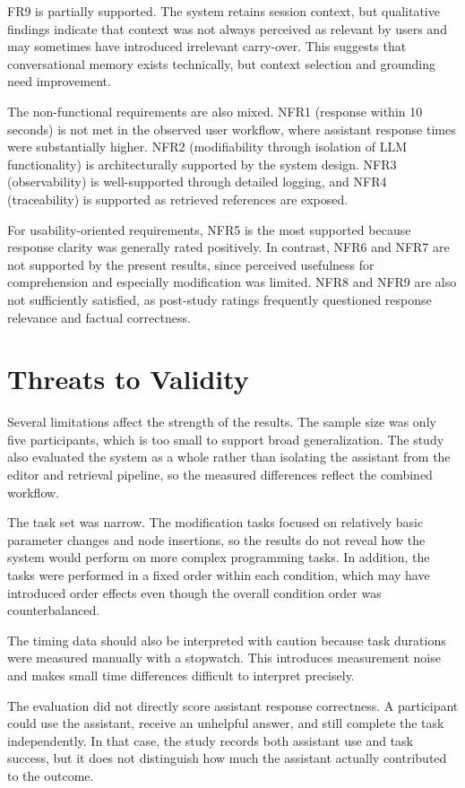 FR9 is partially supported. The system retains session context, but qualitative findings indicate that context was not always perceived as relevant by users and may sometimes have introduced irrelevant carry-over. This suggests that conversational memory exists technically, but context selection and grounding need improvement.

The non-functional requirements are also mixed. NFR1 (response within 10 seconds) is not met in the observed user workflow, where assistant response times were substantially higher. NFR2 (modifiability through isolation of LLM functionality) is architecturally supported by the system design. NFR3 (observability) is well-supported through detailed logging, and NFR4 (traceability) is supported as retrieved references are exposed.

For usability-oriented requirements, NFR5 is the most supported because response clarity was generally rated positively. In contrast, NFR6 and NFR7 are not supported by the present results, since perceived usefulness for comprehension and especially modification was limited. NFR8 and NFR9 are also not sufficiently satisfied, as post-study ratings frequently questioned response relevance and factual correctness.

\section{Threats to Validity}
Several limitations affect the strength of the results. The sample size was only five participants, which is too small to support broad generalization. The study also evaluated the system as a whole rather than isolating the assistant from the editor and retrieval pipeline, so the measured differences reflect the combined workflow.

The task set was narrow. The modification tasks focused on relatively basic parameter changes and node insertions, so the results do not reveal how the system would perform on more complex programming tasks. In addition, the tasks were performed in a fixed order within each condition, which may have introduced order effects even though the overall condition order was counterbalanced.

The timing data should also be interpreted with caution because task durations were measured manually with a stopwatch. This introduces measurement noise and makes small time differences difficult to interpret precisely.

The evaluation did not directly score assistant response correctness. A participant could use the assistant, receive an unhelpful answer, and still complete the task independently. In that case, the study records both assistant use and task success, but it does not distinguish how much the assistant actually contributed to the outcome.


